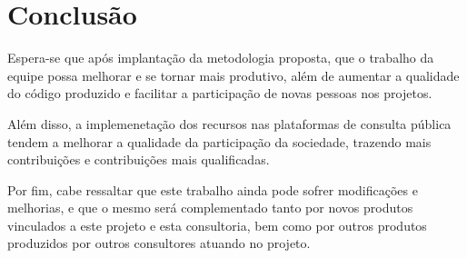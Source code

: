 \chapter{Conclusão}
Espera-se que após implantação da metodologia proposta, que o trabalho da equipe possa melhorar e se tornar mais produtivo, além de aumentar a qualidade do código produzido e facilitar a participação de novas pessoas nos projetos.

Além disso, a implemenetação dos recursos nas plataformas de consulta pública tendem a melhorar a qualidade da participação da sociedade, trazendo mais contribuições e contribuições mais qualificadas.

Por fim, cabe ressaltar que este trabalho ainda pode sofrer modificações e melhorias, e que o mesmo será complementado tanto por novos produtos vinculados a este projeto e esta consultoria, bem como por outros produtos produzidos por outros consultores atuando no projeto.
